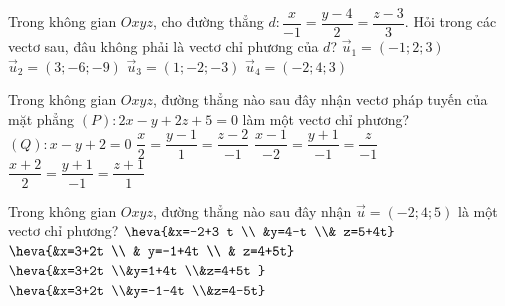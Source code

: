 \begin{ex}%
	Trong không gian $Oxyz$, cho đường thẳng $d:\dfrac{x}{-1}=\dfrac{y-4}{2}=\dfrac{z-3}{3}$. Hỏi trong các vectơ sau, đâu không phải là vectơ chỉ phương của $d$?
	\choice
		{$\overrightarrow{u}_1=\left(-1;2;3\right)$}
		{$\overrightarrow{u}_2=\left(3;-6;-9\right)$}
		{$\overrightarrow{u}_3=\left(1;-2;-3\right)$}
		{\True $\overrightarrow{u}_4=\left(-2;4;3\right)$}
\end{ex}
\begin{ex}%
	Trong không gian $Oxyz$, đường thẳng nào sau đây nhận vectơ pháp tuyến của mặt phẳng $(P) \colon 2x-y+2z+5=0$ làm một vectơ chỉ phương?
	\choice
	{$( Q) \colon x-y+2=0$}
	{$\dfrac{x}{2}=\dfrac{y-1}{1}=\dfrac{z-2}{-1}$}
	{\True $\dfrac{x-1}{-2}=\dfrac{y+1}{-1}=\dfrac{z}{-1}$}
	{$\dfrac{x+2}{2}=\dfrac{y+1}{-1}=\dfrac{z+1}{1}$}
\end{ex}
\begin{ex}%
	Trong không gian $Oxyz$, đường thẳng nào sau đây nhận ${\overrightarrow{u}=(-2 ; 4 ; 5)}$ là một vectơ chỉ phương?
	\choice
	{$\heva{&x=-2+3 t \\ &y=4-t \\& z=5+4t}$}
	{$\heva{&x=3+2t \\ & y=-1+4t \\ & z=4+5t}$}
	{$\heva{&x=3+2t  \\&y=1+4t  \\&z=4+5t }$}
	{\True $\heva{&x=3+2t  \\&y=-1-4t  \\&z=4-5t}$}
\end{ex}
